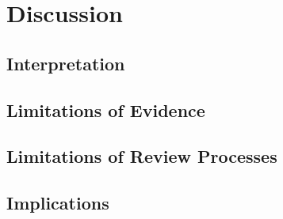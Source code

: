 \chapter{Discussion}
\label{chapterlabel4}

\section{Interpretation}
    

\section{Limitations of Evidence}


\section{Limitations of Review Processes}


\section{Implications}